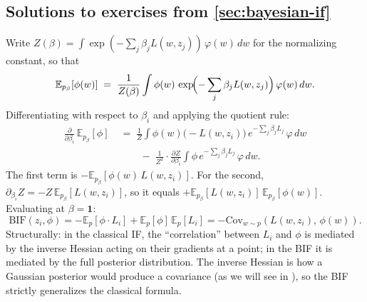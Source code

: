 \documentclass[11pt]{article}
\newcommand{\E}{\mathbb{E}}
\begin{document}
\begin{pdfonly}\begin{solutionsonly}
\subsection{Solutions to exercises from \cref{sec:bayesian-if}}
\end{solutionsonly}\end{pdfonly}

\begin{solution}

Write $Z(\beta) = \int \exp(-\sum_j \beta_j L(w,z_j))\,\varphi(w)\,dw$ for the normalizing constant, so that
\[
  \E_{p_\beta}[\phi(w)] \;=\; \frac{1}{Z(\beta)}\int \phi(w)\,\exp\!\Bigl(-\sum_j \beta_j L(w,z_j)\Bigr)\,\varphi(w)\,dw.
\]
Differentiating with respect to $\beta_i$ and applying the quotient rule:
\begin{align*}
  \frac{\partial}{\partial\beta_i}\,\E_{p_\beta}[\phi] &\;=\; \frac{1}{Z}\int \phi(w)\bigl(-L(w,z_i)\bigr)\,e^{-\sum_j\beta_j L_j}\,\varphi\,dw \\
  &\qquad\;-\; \frac{1}{Z^2}\cdot\frac{\partial Z}{\partial\beta_i}\int \phi\,e^{-\sum_j\beta_j L_j}\,\varphi\,dw.
\end{align*}
The first term is $-\E_{p_\beta}[\phi(w)\,L(w,z_i)]$. For the second, $\partial_{\beta_i}Z = -Z\,\E_{p_\beta}[L(w,z_i)]$, so it equals $+\E_{p_\beta}[L(w,z_i)]\,\E_{p_\beta}[\phi(w)]$. Evaluating at $\beta=\mathbf{1}$:
\[
  \mathrm{BIF}(z_i,\phi) = -\E_p[\phi\cdot L_i] + \E_p[\phi]\,\E_p[L_i] = -\mathrm{Cov}_{w\sim p}(L(w,z_i),\,\phi(w)).
\]
Structurally: in the classical IF, the ``correlation'' between $L_i$ and $\phi$ is mediated by the inverse Hessian acting on their gradients at a point; in the BIF it is mediated by the full posterior distribution. The inverse Hessian is how a Gaussian posterior would produce a covariance (as we will see in ), so the BIF strictly generalizes the classical formula.

\end{solution}
\end{document}
